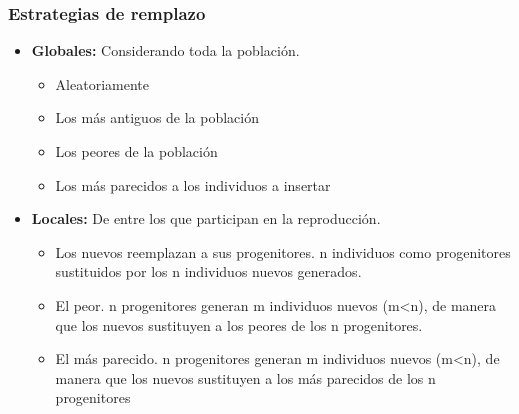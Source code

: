 \documentclass[12pt, twoside, openright]{report} %
\begin{document}
\subsubsection{Estrategias de remplazo}
\begin{itemize}
	\item \textbf{Globales:} Considerando toda la población.
	      \begin{itemize}
		      \item Aleatoriamente
		      \item Los más antiguos de la población
		      \item Los peores de la población
		      \item Los más parecidos a los individuos a insertar
	      \end{itemize}
	\item \textbf{Locales:} De entre los que participan en la reproducción.
	      \begin{itemize}
		      \item Los nuevos reemplazan a sus progenitores. n individuos como progenitores sustituidos por los n individuos nuevos generados.
		      \item El peor. n progenitores generan m individuos nuevos (m<n), de manera que los nuevos sustituyen a los peores de los n progenitores.
		      \item El más parecido. n progenitores generan m individuos nuevos (m<n), de manera que los nuevos sustituyen a los más parecidos de los n progenitores
	      \end{itemize}
\end{itemize}
\end{document}
